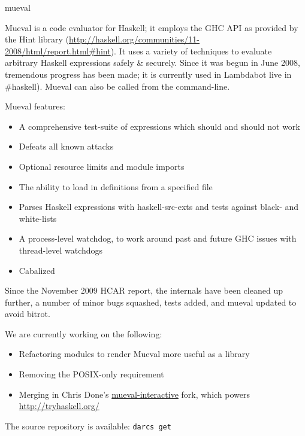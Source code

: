 \begin{hcarentry}{mueval}
\label{mueval}
\makeheader

Mueval is a code evaluator for Haskell; it employs the GHC API as provided by the Hint library (\url{http://haskell.org/communities/11-2008/html/report.html#hint}). It uses a variety of techniques to evaluate arbitrary Haskell expressions safely \& securely. Since it was begun in June 2008, tremendous progress has been made; it is currently used in Lambdabot live in \#haskell). Mueval can also be called from the command-line.

Mueval features:
\begin{itemize}
\item A comprehensive test-suite of expressions which should and should not work
\item Defeats all known attacks
\item Optional resource limits and module imports
\item The ability to load in definitions from a specified file
\item Parses Haskell expressions with haskell-src-exts and tests against black- and white-lists
\item A process-level watchdog, to work around past and future GHC issues with thread-level watchdogs
\item Cabalized
\end{itemize}

Since the November 2009 HCAR report, the internals have been cleaned up further, a number of minor bugs squashed, tests added, and mueval updated to avoid bitrot.

We are currently working on the following:
\begin{itemize}
\item Refactoring modules to render Mueval more useful as a library
\item Removing the POSIX-only requirement
\item Merging in Chris Done's \href{http://github.com/chrisdone/mueval-interactive}{mueval-interactive} fork, which powers \url{http://tryhaskell.org/}
\end{itemize}

\FurtherReading
The source repository is available:
 \texttt{darcs get}
\end{hcarentry}
